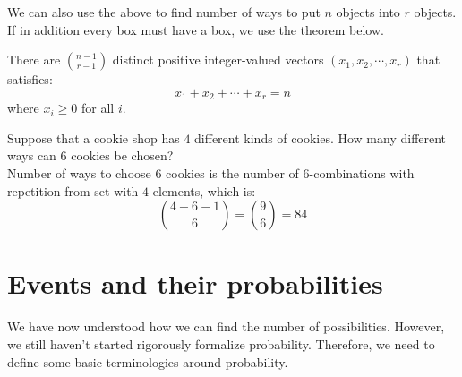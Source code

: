 \documentclass{huhtakm-template-book}
\begin{document}
We can also use the above to find number of ways to put $n$ objects into $r$ objects. If in addition every box must have a box, we use the theorem below.
\begin{thm}
	There are $\binom{n-1}{r-1}$ distinct positive integer-valued vectors $(x_{1},x_{2},\cdots,x_{r})$ that satisfies:
	\begin{equation*}
		x_{1}+x_{2}+\cdots+x_{r}=n
	\end{equation*}
	where $x_{i}\geq 0$ for all $i$.
\end{thm}
\begin{eg}
	Suppose that a cookie shop has $4$ different kinds of cookies. How many different ways can $6$ cookies be chosen?\\
	Number of ways to choose $6$ cookies is the number of $6$-combinations with repetition from set with $4$ elements, which is:
	\begin{equation*}
		\binom{4+6-1}{6}=\binom{9}{6}=84
	\end{equation*}
\end{eg}


\chapter{Events and their probabilities}
We have now understood how we can find the number of possibilities. However, we still haven't started rigorously formalize probability. Therefore, we need to define some basic terminologies around probability.
\end{document}
